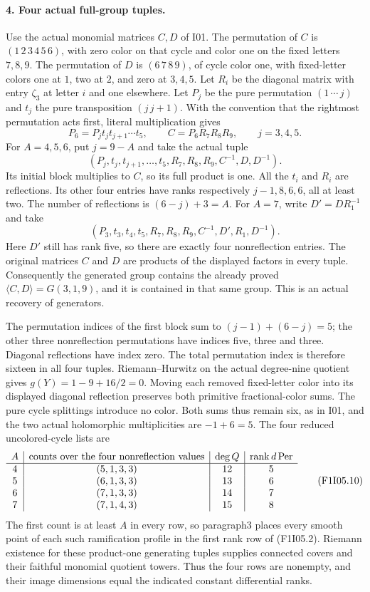 \paragraph{4. Four actual full-group tuples.}
Use the actual monomial matrices $C,D$ of I01. The
permutation of $C$ is $(1\,2\,3\,4\,5\,6)$, with
zero color on that cycle and color one on the fixed
letters $7,8,9$. The permutation of $D$ is $(6\,7\,8\,9)$,
of cycle color one, with fixed-letter colors one at $1$,
two at $2$, and zero at $3,4,5$.
Let $R_i$ be the diagonal matrix with entry $\zeta_3$ at
letter $i$ and one elsewhere. Let $P_j$ be the pure
permutation $(1\,\cdots\,j)$ and $t_j$ the pure
transposition $(j\,j+1)$.
With the convention that the rightmost permutation acts first,
literal multiplication gives
\[
 P_6=P_jt_jt_{j+1}\cdots t_5,\qquad
 C=P_6R_7R_8R_9,\qquad j=3,4,5.
 \tag{F1I05.7}
\]
For $A=4,5,6$, put $j=9-A$ and take the actual tuple
\[
 (P_j,t_j,t_{j+1},\ldots,t_5,
          R_7,R_8,R_9,C^{-1},D,D^{-1}).
 \tag{F1I05.8}
\]
Its initial block multiplies to $C$, so its full product is one.
All the $t_i$ and $R_i$ are reflections. Its other four
entries have ranks respectively $j-1,8,6,6$, all at least
two. The number of reflections is $(6-j)+3=A$.
For $A=7$, write $D'=DR_1^{-1}$ and take
\[
 (P_3,t_3,t_4,t_5,R_7,R_8,R_9,
                        C^{-1},D',R_1,D^{-1}).
 \tag{F1I05.9}
\]
Here $D'$ still has rank five, so there are exactly four
nonreflection entries. The original matrices $C$ and $D$
are products of the displayed factors in every tuple.
Consequently the generated group contains the already proved
$\langle C,D\rangle=G(3,1,9)$, and it is contained in
that same group. This is an actual recovery of generators.

The permutation indices of the first block sum to
$(j-1)+(6-j)=5$; the other three nonreflection permutations
have indices five, three and three. Diagonal reflections
have index zero. The total permutation index is therefore
sixteen in all four tuples. Riemann--Hurwitz on the actual
degree-nine quotient gives $g(Y)=1-9+16/2=0$.
Moving each removed fixed-letter color into its displayed
diagonal reflection preserves both primitive fractional-color
sums. The pure cycle splittings introduce no color.
Both sums thus remain six, as in I01, and the two actual
holomorphic multiplicities are $-1+6=5$.
The four reduced uncolored-cycle lists are
\[
\begin{array}{c|c|c|c}
 A&\hbox{counts over the four nonreflection values}&
       \deg Q&\operatorname{rank}d\operatorname{Per}\\ \hline
 4&(5,1,3,3)&12&5\\
 5&(6,1,3,3)&13&6\\
 6&(7,1,3,3)&14&7\\
 7&(7,1,4,3)&15&8
\end{array}
 \tag{F1I05.10}
\]
The first count is at least $A$ in every row, so paragraph3
places every smooth point of each such ramification profile
in the first rank row of (F1I05.2). Riemann existence for
these product-one generating tuples supplies connected
covers and their faithful monomial quotient towers. Thus
the four rows are nonempty, and their image dimensions equal
the indicated constant differential ranks.

